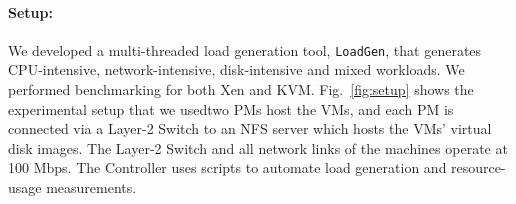 \paragraph{Setup:}
We developed a multi-threaded load generation 
tool, \texttt{LoadGen}, that generates
CPU-intensive, network-intensive, disk-intensive and mixed workloads.
We performed benchmarking for both Xen and KVM.
Fig.~\ref{fig:setup} shows the experimental setup that we
used\textemdash{}two PMs host the VMs, and
each PM is connected via a Layer-2 Switch to an NFS server which hosts
the VMs' virtual disk images.
The Layer-2 Switch and all network links of the
machines operate at 100 Mbps.
The Controller uses scripts to automate
load generation and resource-usage measurements.

%

\vspace{-0.4in}
